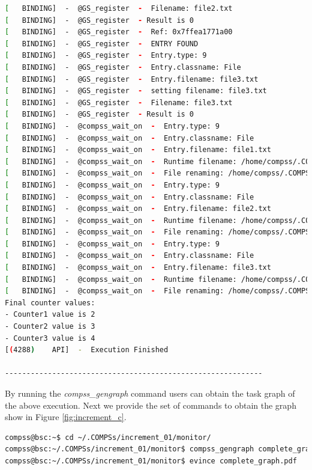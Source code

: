 \begin{lstlisting}[language=bash]
[   BINDING]  -  @GS_register  -  Filename: file2.txt
[   BINDING]  -  @GS_register  - Result is 0
[   BINDING]  -  @GS_register  -  Ref: 0x7ffea1771a00
[   BINDING]  -  @GS_register  -  ENTRY FOUND
[   BINDING]  -  @GS_register  -  Entry.type: 9
[   BINDING]  -  @GS_register  -  Entry.classname: File
[   BINDING]  -  @GS_register  -  Entry.filename: file3.txt
[   BINDING]  -  @GS_register  -  setting filename: file3.txt
[   BINDING]  -  @GS_register  -  Filename: file3.txt
[   BINDING]  -  @GS_register  - Result is 0
[   BINDING]  -  @compss_wait_on  -  Entry.type: 9
[   BINDING]  -  @compss_wait_on  -  Entry.classname: File
[   BINDING]  -  @compss_wait_on  -  Entry.filename: file1.txt
[   BINDING]  -  @compss_wait_on  -  Runtime filename: /home/compss/.COMPSs/increment_01/tmpFiles/d1v11_1479142004112.IT
[   BINDING]  -  @compss_wait_on  -  File renaming: /home/compss/.COMPSs/increment_01/tmpFiles/d1v11_1479142004112.IT to file1.txt
[   BINDING]  -  @compss_wait_on  -  Entry.type: 9
[   BINDING]  -  @compss_wait_on  -  Entry.classname: File
[   BINDING]  -  @compss_wait_on  -  Entry.filename: file2.txt
[   BINDING]  -  @compss_wait_on  -  Runtime filename: /home/compss/.COMPSs/increment_01/tmpFiles/d2v11_1479142004112.IT
[   BINDING]  -  @compss_wait_on  -  File renaming: /home/compss/.COMPSs/increment_01/tmpFiles/d2v11_1479142004112.IT to file2.txt
[   BINDING]  -  @compss_wait_on  -  Entry.type: 9
[   BINDING]  -  @compss_wait_on  -  Entry.classname: File
[   BINDING]  -  @compss_wait_on  -  Entry.filename: file3.txt
[   BINDING]  -  @compss_wait_on  -  Runtime filename: /home/compss/.COMPSs/increment_01/tmpFiles/d3v11_1479142004112.IT
[   BINDING]  -  @compss_wait_on  -  File renaming: /home/compss/.COMPSs/increment_01/tmpFiles/d3v11_1479142004112.IT to file3.txt
Final counter values: 
- Counter1 value is 2
- Counter2 value is 3
- Counter3 value is 4
[(4288)    API]  -  Execution Finished

------------------------------------------------------------
\end{lstlisting}

By running the \textit{compss_gengraph} command users can obtain the task graph of the above execution. Next we provide the set of commands
to obtain the graph show in Figure \ref{fig:increment_c}.

\begin{lstlisting}[language=bash]
compss@bsc:~$ cd ~/.COMPSs/increment_01/monitor/
compss@bsc:~/.COMPSs/increment_01/monitor$ compss_gengraph complete_graph.dot
compss@bsc:~/.COMPSs/increment_01/monitor$ evince complete_graph.pdf
\end{lstlisting}

